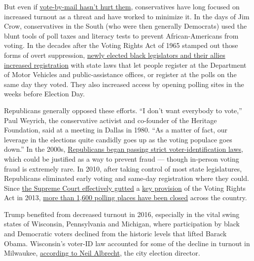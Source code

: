 But even if
\href{https://www.nytimes3xbfgragh.onion/2020/04/10/us/politics/vote-by-mail.html}{vote-by-mail
hasn't hurt them}, conservatives have long focused on increased turnout
as a threat and have worked to minimize it. In the days of Jim Crow,
conservatives in the South (who were then generally Democrats) used the
blunt tools of poll taxes and literacy tests to prevent
African-Americans from voting. In the decades after the Voting Rights
Act of 1965 stamped out those forms of overt suppression,
\href{https://www.nytimes3xbfgragh.onion/2015/07/29/magazine/voting-rights-act-dream-undone.html}{newly
elected black legislators and their allies increased registration} with
state laws that let people register at the Department of Motor Vehicles
and public-assistance offices, or register at the polls on the same day
they voted. They also increased access by opening polling sites in the
weeks before Election Day.

Republicans generally opposed these efforts. ``I don't want everybody to
vote,'' Paul Weyrich, the conservative activist and co-founder of the
Heritage Foundation, said at a meeting in Dallas in 1980. ``As a matter
of fact, our leverage in the elections quite candidly goes up as the
voting populace goes down.'' In the 2000s,
\href{https://www.ncsl.org/research/elections-and-campaigns/voter-id-history.aspx}{Republicans
began passing strict voter-identification laws}, which could be
justified as a way to prevent fraud --- though in-person voting fraud is
extremely rare. In 2010, after taking control of most state
legislatures, Republicans eliminated early voting and same-day
registration where they could. Since
\href{https://www.nytimes3xbfgragh.onion/2016/11/07/magazine/the-supreme-court-ruled-that-voting-restrictions-were-a-bygone-problem-early-voting-results-suggest-otherwise.html}{the
Supreme Court effectively gutted} a
\href{http://www.slate.com/articles/news_and_politics/jurisprudence/2013/02/the_voting_rights_act_and_shelby_county_v_holder_how_the_supreme_court_could.html}{key
provision} of the Voting Rights Act in 2013,
\href{http://civilrightsdocs.info/pdf/reports/Democracy-Diverted.pdf}{more
than 1,600 polling places have been closed} across the country.

Trump benefited from decreased turnout in 2016, especially in the vital
swing states of Wisconsin, Pennsylvania and Michigan, where
participation by black and Democratic voters declined from the historic
levels that lifted Barack Obama. Wisconsin's voter-ID law accounted for
some of the decline in turnout in Milwaukee,
\href{https://www.motherjones.com/politics/2017/10/voter-suppression-wisconsin-election-2016/}{according
to Neil Albrecht}, the city election director.

